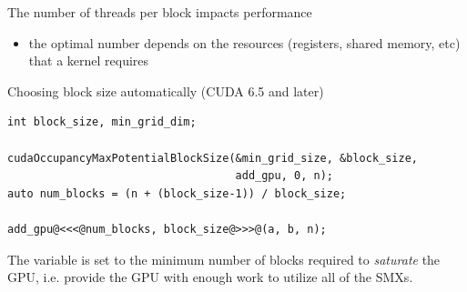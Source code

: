 \begin{frame}[fragile]{}
    \begin{info}{The number of threads per block impacts performance}
    \begin{itemize}
        \item the optimal number depends on the resources (registers, shared memory, etc) that a kernel requires
    \end{itemize}
    \end{info}

    \begin{code}{Choosing block size automatically (CUDA 6.5 and later)}
        \begin{lstlisting}[style=boxcudatiny]
int block_size, min_grid_dim;

cudaOccupancyMaxPotentialBlockSize(&min_grid_size, &block_size,
                                   add_gpu, 0, n);
auto num_blocks = (n + (block_size-1)) / block_size;

add_gpu@<<<@num_blocks, block_size@>>>@(a, b, n);
        \end{lstlisting}
    \end{code}

    \begin{info}{}
    The variable  is set to the minimum number of blocks required to \emph{saturate} the GPU, i.e. provide the GPU with enough work to utilize all of the SMXs.
    \end{info}
\end{frame}

